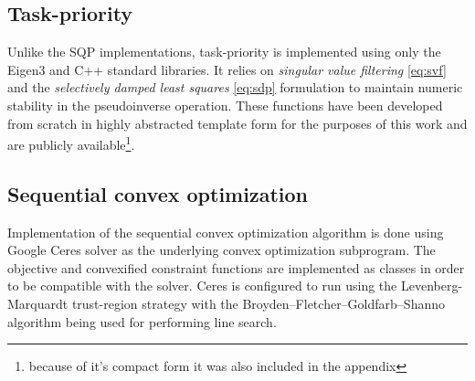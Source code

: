 \documentclass[times, utf8, diplomski, english]{fer}
\begin{document}
\subsection{Task-priority}
Unlike the SQP implementations, task-priority is implemented using only the Eigen3 and C++ standard libraries.
It relies on \textit{singular value filtering} \eqref{eq:svf} and the \textit{selectively damped least squares} \eqref{eq:sdp} formulation to maintain numeric stability in the pseudoinverse operation.
These functions have been developed from scratch in highly abstracted template form for the purposes of this work and are publicly available\footnote{because of it's compact form it was also included in the appendix}.

\subsection{Sequential convex optimization}
Implementation of the sequential convex optimization algorithm is done using Google Ceres solver as the underlying convex optimization subprogram.
The objective and convexified constraint functions are implemented as classes in order to be compatible with the solver.
Ceres is configured to run using the Levenberg-Marquardt trust-region strategy with the Broyden–Fletcher–Goldfarb–Shanno algorithm being used for performing line search.
\end{document}
